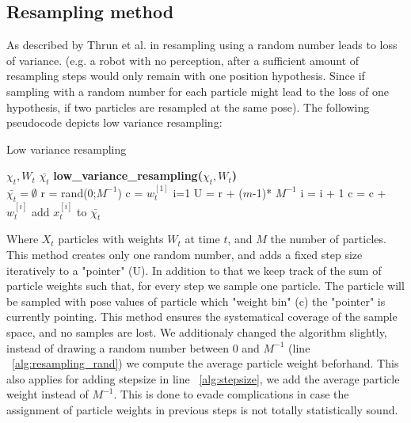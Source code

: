 \documentclass[	DIV=calc,%
							paper=a4,%
							fontsize=9pt,%
							twocolumn]{scrartcl}	 					%
\begin{document}
\subsection{Resampling method}
As described by Thrun et al. in \cite{ProbabilisticRobotics} resampling using a random number leads to loss of variance. (e.g. a robot with no perception, after a sufficient amount of resampling steps would only remain with one position hypothesis. Since if sampling with a random number for each particle might lead to the loss of one hypothesis, if two particles are resampled at the same pose).
The following pseudocode depicts low variance resampling:\\
\begin{algorithm}[h!]
\caption{Low variance resampling}
\label{line}
\begin{algorithmic}[1]
$\chi_{t},W_t $
$\bar{\chi_t}$
\STATE \textbf{low\_variance\_resampling(}$\chi_{t},W_t$\textbf{)}\\
\STATE  $\bar{\chi_t} =  \emptyset$
\STATE r = rand(0;$M^{-1}$)\label{alg:resampling_rand}
\STATE c = $w^{[1]}_t$
\STATE  i=1
\STATE U = r + ($m$-1)* $M^{-1}$\label{alg:stepsize}
\STATE i = i + 1\;
\STATE c = c + $w^{[i]}_t$
\ENDWHILE
\STATE  add $x^{[i]}_t$ to $\bar{\chi_t}$
\ENDFOR
\end{algorithmic}
\end{algorithm}

Where $X_t$ particles with weights $W_t$ at time $t$, and $M$ the number of particles.
This method creates only one random number, and adds a fixed step size iteratively to a "pointer" (U).
In addition to that we keep track of the sum of particle weights such that, for every step we sample one particle. The particle will be sampled with pose values of particle which "weight bin" (c) the "pointer" is currently pointing. 
This method ensures the systematical coverage of the sample space, and no samples are lost.
We additionaly changed the algorithm slightly, instead of drawing a random number between 0 and $M^{-1}$ (line ~\ref{alg:resampling_rand}) we compute the average particle weight beforhand. This also applies for adding stepsize in line ~\ref{alg:stepsize}, we add the average particle weight instead of $M^{-1}$. This is done to evade complications in case the assignment of particle weights in previous steps is not totally statistically sound.
\end{document}
